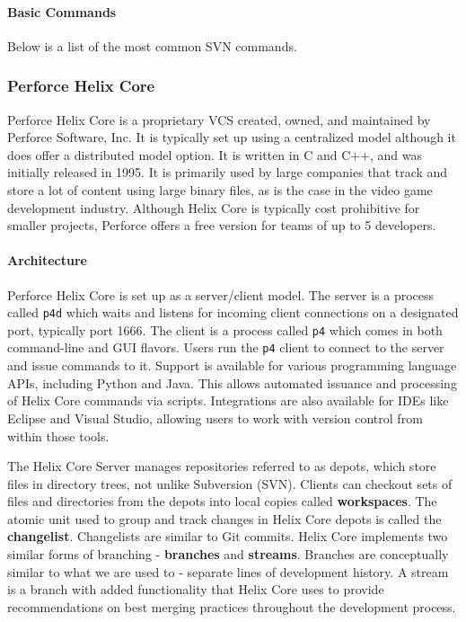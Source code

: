 \paragraph{Basic Commands}

Below is a list of the most common SVN commands.

\subsubsection{Perforce Helix Core}
Perforce Helix Core is a proprietary VCS created, owned, and maintained by Perforce Software, Inc. It is typically set up using a centralized model although it does offer a distributed model option. It is written in C and C++, and was initially released in 1995. It is primarily used by large companies that track and store a lot of content using large binary files, as is the case in the video game development industry. Although Helix Core is typically cost prohibitive for smaller projects, Perforce offers a free version for teams of up to 5 developers.
\paragraph{Architecture}
Perforce Helix Core is set up as a server/client model. The server is a process called \lstinline{p4d} which waits and listens for incoming client connections on a designated port, typically port 1666. The client is a process called \lstinline{p4} which comes in both command-line and GUI flavors. Users run the \lstinline{p4} client to connect to the server and issue commands to it. Support is available for various programming language APIs, including Python and Java. This allows automated issuance and processing of Helix Core commands via scripts. Integrations are also available for IDEs like Eclipse and Visual Studio, allowing users to work with version control from within those tools.

The Helix Core Server manages repositories referred to as depots, which store files in directory trees, not unlike Subversion (SVN). Clients can checkout sets of files and directories from the depots into local copies called \textbf{workspaces}. The atomic unit used to group and track changes in Helix Core depots is called the \textbf{changelist}. Changelists are similar to Git commits. Helix Core implements two similar forms of branching - \textbf{branches} and \textbf{streams}. Branches are conceptually similar to what we are used to - separate lines of development history. A stream is a branch with added functionality that Helix Core uses to provide recommendations on best merging practices throughout the development process.


